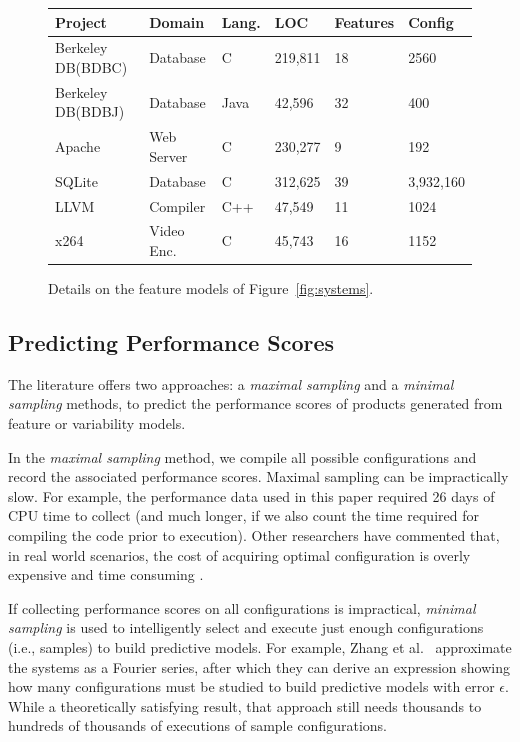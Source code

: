 \documentclass{sig-alternative}
\newcommand{\fig}[1]{Figure~\ref{fig:#1}}
\begin{document}
\begin{figure}[!h]
\scriptsize
\begin{tabular}{llllll}
  \hline
Project & Domain & Lang. & LOC & Features & Config\\\hline
Berkeley DB(BDBC)   & Database & C & 219,811 & 18 & 2560\\
Berkeley DB(BDBJ)   & Database & Java & 42,596 & 32  & 400\\
Apache & Web Server & C & 230,277 & 9 & 192\\
SQLite & Database & C & 312,625 & 39 & 3,932,160\\
LLVM & Compiler & C++ & 47,549 & 11 & 1024\\
x264 & Video Enc. & C& 45,743 & 16 & 1152\\\hline
\end{tabular}
\caption{Details on the feature models of \fig{systems}.}
\label{fig:subjectsystems}
\end{figure}


\subsection{Predicting Performance Scores}\label{sect:addit}
The literature offers two approaches: a {\em maximal sampling} and a {\em minimal sampling} methods, to predict the performance scores of products generated from feature or variability models. 

In the {\em maximal sampling} method, we compile all  possible configurations and record the associated performance scores. Maximal sampling  can be impractically slow.
For example, the performance data used in this paper required  26 days of CPU time to collect (and much longer, if we also count the time required
 for compiling the code prior to execution). 
 Other researchers have commented that,  in 
 real world scenarios, the cost of acquiring optimal configuration is overly expensive and time consuming \cite{weiss2008maximizing}.
 
 If collecting performance scores on all configurations is impractical,  {\em minimal sampling } 
 is used to intelligently select and execute   just enough configurations (i.e., samples) to build
 predictive models.
 For example, Zhang et al.~\cite{zhang2015performance} approximate the
 systems as a Fourier series, after which they can derive an expression showing how many configurations must be studied
 to build predictive models with error $\epsilon$. While a theoretically satisfying result, that approach still needs thousands to hundreds of thousands of executions of sample
 configurations.  
\end{document}
